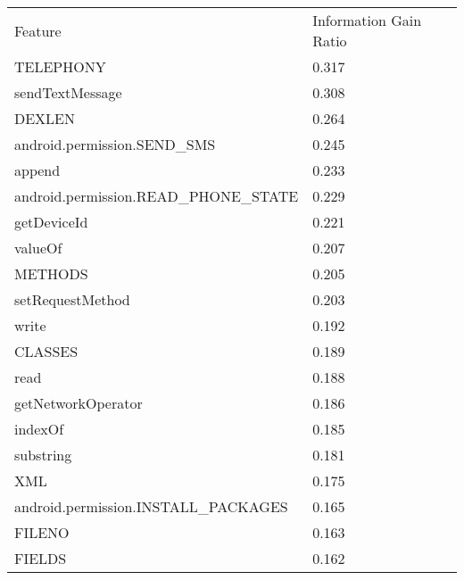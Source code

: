 \begin{tabular}{l l}
 Feature & Information Gain Ratio \\
 TELEPHONY & 0.317 \\
 sendTextMessage & 0.308 \\
 DEXLEN & 0.264 \\
 android.permission.SEND\_SMS & 0.245 \\
 append & 0.233 \\
 android.permission.READ\_PHONE\_STATE & 0.229 \\
 getDeviceId & 0.221 \\
 valueOf & 0.207 \\
 METHODS & 0.205 \\
 setRequestMethod & 0.203 \\
 write & 0.192 \\
 CLASSES & 0.189 \\
 read & 0.188 \\
 getNetworkOperator & 0.186 \\
 indexOf & 0.185 \\
 substring & 0.181 \\
 XML & 0.175 \\
 android.permission.INSTALL\_PACKAGES & 0.165 \\
 FILENO & 0.163 \\
 FIELDS & 0.162 \\
\end{tabular}


